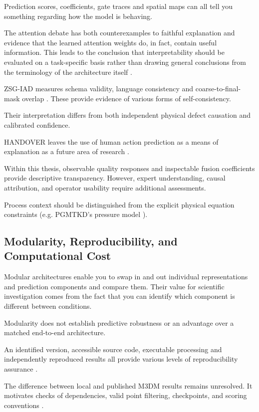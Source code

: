 Prediction scores, coefficients, gate traces and spatial maps can all tell you something regarding
how the model is behaving.

The attention debate has both counterexamples to faithful explanation and evidence that the learned
attention weights do, in fact, contain useful information. This leads to the conclusion that
interpretability should be evaluated on a task-specific basis rather than drawing general
conclusions from the terminology of the architecture itself \parencite{P036}.

ZSG-IAD measures schema validity, language consistency and coarse-to-final-mask overlap
\parencite{P025}. These provide evidence of various forms of self-consistency.

Their interpretation differs from both independent physical defect causation and calibrated
confidence.

HANDOVER leaves the use of human action prediction as a means of explanation as a future area of
research \parencite{Thoduka2024Handover}.

Within this thesis, observable quality responses and inspectable fusion coefficients provide
descriptive transparency. However, expert understanding, causal attribution, and operator usability
require additional assessments.

Process context should be distinguished from the explicit physical equation constraints (e.g.
PGMTKD's pressure model \parencite{Li2025PGMTKD}).

\subsection{Modularity, Reproducibility, and Computational Cost}

Modular architectures enable you to swap in and out individual representations and prediction
components and compare them. Their value for scientific investigation comes from the fact that you
can identify which component is different between conditions.

Modularity does not establish predictive robustness or an advantage over a matched end-to-end
architecture.

An identified version, accessible source code, executable processing and independently reproduced
results all provide various levels of reproducibility assurance \parencite{P009}.

The difference between local and published M3DM results remains unresolved. It motivates checks of
dependencies, valid point filtering, checkpoints, and scoring conventions \parencite{P033}.

